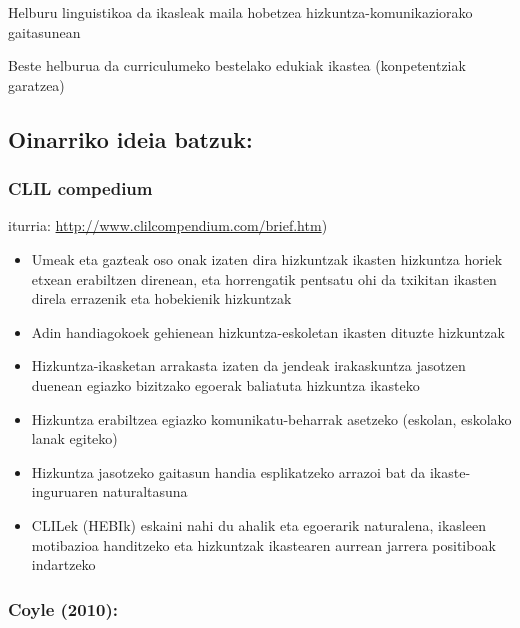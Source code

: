 \documentclass[
]{book}
\providecommand{\tightlist}{%
  \setlength{\itemsep}{0pt}\setlength{\parskip}{0pt}}
\begin{document}
Helburu linguistikoa da ikasleak maila hobetzea hizkuntza-komunikaziorako gaitasunean

Beste helburua da curriculumeko bestelako edukiak ikastea (konpetentziak garatzea)

\hypertarget{oinarriko-ideia-batzuk}{%
\subsection{Oinarriko ideia batzuk:}\label{oinarriko-ideia-batzuk}}

\hypertarget{clil-compedium}{%
\subsubsection{CLIL compedium}\label{clil-compedium}}

iturria: \url{http://www.clilcompendium.com/brief.htm})

\begin{itemize}
\tightlist
\item
  Umeak eta gazteak oso onak izaten dira hizkuntzak ikasten hizkuntza horiek etxean erabiltzen direnean, eta horrengatik pentsatu ohi da txikitan ikasten direla errazenik eta hobekienik hizkuntzak
\item
  Adin handiagokoek gehienean hizkuntza-eskoletan ikasten dituzte hizkuntzak
\item
  Hizkuntza-ikasketan arrakasta izaten da jendeak irakaskuntza jasotzen duenean egiazko bizitzako egoerak baliatuta hizkuntza ikasteko
\item
  Hizkuntza erabiltzea egiazko komunikatu-beharrak asetzeko (eskolan, eskolako lanak egiteko)
\item
  Hizkuntza jasotzeko gaitasun handia esplikatzeko arrazoi bat da ikaste-inguruaren naturaltasuna
\item
  CLILek (HEBIk) eskaini nahi du ahalik eta egoerarik naturalena, ikasleen motibazioa handitzeko eta hizkuntzak ikastearen aurrean jarrera positiboak indartzeko
\end{itemize}

\hypertarget{coyle-2010}{%
\subsubsection{Coyle (2010):}\label{coyle-2010}}
\end{document}
